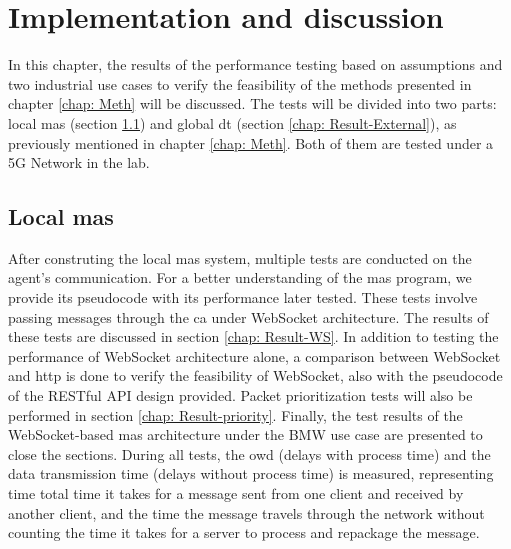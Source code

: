 \chapter{Implementation and discussion} \label{chap: Result}

In this chapter, the results of the performance testing based on assumptions 
and two industrial use cases to verify the feasibility of the methods presented 
in chapter \ref{chap: Meth} will be discussed. The tests will be divided into 
two parts: local \gls{mas} (section \ref{chap: Result-Internal}) and 
global \gls{dt} (section \ref{chap: Result-External}), as previously mentioned in 
chapter \ref{chap: Meth}. Both of them are tested under a 5G Network in the lab.



\section{Local \gls{mas}}\label{chap: Result-Internal}
After construting the local \gls{mas} system, multiple tests are conducted on the 
agent's communication. For a better understanding of the \gls{mas} program, we 
provide its pseudocode with its performance later tested. These tests involve 
passing messages through the \gls{ca} under 
WebSocket architecture. The results of these tests are discussed in 
section \ref{chap: Result-WS}. In addition to testing the performance of WebSocket 
architecture alone, a comparison between WebSocket and \gls{http} is done to verify 
the feasibility of WebSocket, also with the pseudocode of the RESTful API design 
provided. Packet prioritization tests will also be performed in 
section \ref{chap: Result-priority}. Finally, the test results of the 
WebSocket-based \gls{mas} architecture under the BMW use case are presented to 
close the sections. During all tests, the \gls{owd} (delays with process time) and 
the data transmission time (delays without process time) is measured, representing 
time total time it takes for a message sent from one client and received by another client, 
and the time the message travels through the network without counting the time 
it takes for a server to process and repackage the message. 



